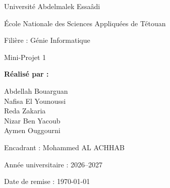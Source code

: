 
\begin{titlepage}
    \centering
    \thispagestyle{empty}

    {\large Université Abdelmalek Essaâdi\par}
    \vspace{0.3cm}
    {\large École Nationale des Sciences Appliquées de Tétouan\par}
    \vspace{0.3cm}
    {\large Filière : Génie Informatique\par}

    \vspace{2.2cm}

    {\Huge\bfseries \projecttitle\par}
    \vspace{0.5cm}
    {\LARGE\bfseries \projectname\par}
    \vspace{0.3cm}
    {\large \projectversion\par}
    \vspace{0.3cm}
    {\large Mini-Projet 1\par}

    \vspace{2cm}

    {\large\bfseries Réalisé par :\par}
    \vspace{0.4cm}

    {\large
        Abdellah Bouarguan\\
        Nafisa El Younoussi\\
        Reda Zakaria\\
        Nizar Ben Yacoub\\
        Aymen Ouggourni\par
    }

    \vfill

    {\large Encadrant : Mohammed AL ACHHAB\par}
    \vspace{0.4cm}
    {\large Année universitaire : 2026--2027\par}
    {\large Date de remise : \today\par}

\end{titlepage}

